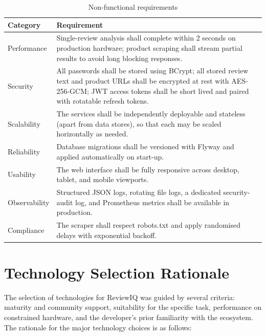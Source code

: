 \documentclass[12pt,a4paper,oneside]{report}
\renewcommand{\texttt}[1]{%
  {\ttfamily\hyphenchar\font=45\relax #1}}
\begin{document}
\begin{table}[ht]
\centering
\caption{Non-functional requirements}
\label{tab:nfr}
\begin{tabularx}{\textwidth}{l X}
\toprule
\textbf{Category} & \textbf{Requirement} \\
\midrule
Performance & Single-review analysis shall complete within 2 seconds on
              production hardware; product scraping shall stream partial
              results to avoid long blocking responses. \\
Security    & All passwords shall be stored using BCrypt; all stored
              review text and product URLs shall be encrypted at rest
              with AES-256-GCM; JWT access tokens shall be short lived
              and paired with rotatable refresh tokens. \\
Scalability & The services shall be independently deployable and
              stateless (apart from data stores), so that each may be
              scaled horizontally as needed. \\
Reliability & Database migrations shall be versioned with Flyway and
              applied automatically on start-up. \\
Usability   & The web interface shall be fully responsive across
              desktop, tablet, and mobile viewports. \\
Observability & Structured JSON logs, rotating file logs, a dedicated
              security-audit log, and Prometheus metrics shall be
              available in production. \\
Compliance  & The scraper shall respect \texttt{robots.txt} and apply
              randomised delays with exponential backoff. \\
\bottomrule
\end{tabularx}
\end{table}

\section{Technology Selection Rationale}
The selection of technologies for ReviewIQ was guided by several criteria:
maturity and community support, suitability for the specific task,
performance on constrained hardware, and the developer's prior familiarity
with the ecosystem. The rationale for the major technology choices is as
follows:
\end{document}
